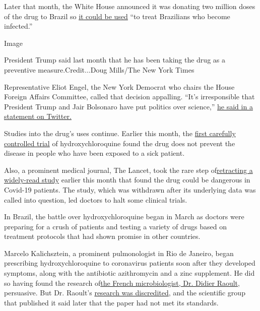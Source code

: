 Later that month, the White House announced it was donating two million
doses of the drug to Brazil so
\href{https://www.whitehouse.gov/briefings-statements/joint-statement-united-states-america-federative-republic-brazil-regarding-health-cooperation/}{it
could be used} ``to treat Brazilians who become infected.''

Image

President Trump said last month that he has been taking the drug as a
preventive measure.Credit...Doug Mills/The New York Times

Representative Eliot Engel, the New York Democrat who chairs the House
Foreign Affairs Committee, called that decision appalling. ``It's
irresponsible that President Trump and Jair Bolsonaro have put politics
over science,''
\href{https://twitter.com/HouseForeign/status/1267826331930128386?s=20}{he
said in a statement on Twitter.}

Studies into the drug's uses continue. Earlier this month, the
\href{https://www.nytimes3xbfgragh.onion/2020/06/03/health/hydroxychloroquine-coronavirus-trump.html}{first
carefully controlled trial} of hydroxychloroquine found the drug does
not prevent the disease in people who have been exposed to a sick
patient.

Also, a prominent medical journal, The Lancet, took the rare step
of\href{https://www.nytimes3xbfgragh.onion/reuters/2020/06/05/world/europe/05reuters-health-coronavirus-hydroxychloroquine-lancet.html}{retracting
a widely-read study} earlier this month that found the drug could be
dangerous in Covid-19 patients. The study, which was withdrawn after its
underlying data was called into question, led doctors to halt some
clinical trials.

In Brazil, the battle over hydroxychloroquine began in March as doctors
were preparing for a crush of patients and testing a variety of drugs
based on treatment protocols that had shown promise in other countries.

Marcelo Kalichsztein, a prominent pulmonologist in Rio de Janeiro, began
prescribing hydroxychloroquine to coronavirus patients soon after they
developed symptoms, along with the antibiotic azithromycin and a zinc
supplement. He did so having found the research
of\href{https://www.nytimes3xbfgragh.onion/2020/05/12/magazine/didier-raoult-hydroxychloroquine.html}{the
French microbiologist, Dr. Didier Raoult}, persuasive. But Dr. Raoult's
\href{https://retractionwatch.com/2020/04/06/hydroxychlorine-covid-19-study-did-not-meet-publishing-societys-expected-standard/}{research
was discredited}, and the scientific group that published it said later
that the paper had not met its standards.

